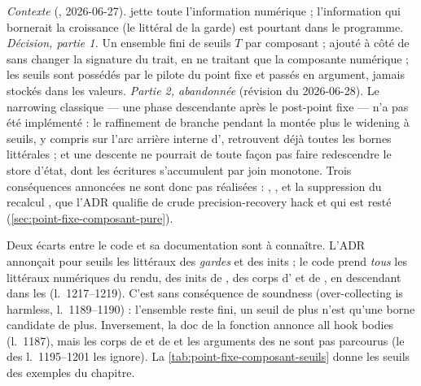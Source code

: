 \begin{decision}
\emph{Contexte} (, 2026-06-27).  jette toute
l'information numérique ; l'information qui bornerait la croissance (le
littéral  de la garde) est pourtant dans le programme.
\emph{Décision, partie 1.} Un ensemble fini de seuils $T$ par composant ;
 ajouté à côté de  sans changer la signature du
trait, en ne traitant que la composante numérique ; les seuils sont possédés
par le pilote du point fixe et passés en argument, jamais stockés dans les
valeurs. \emph{Partie 2, abandonnée} (révision du 2026-06-28). Le narrowing
classique --- une phase descendante après le post-point fixe --- n'a pas été
implémenté : le raffinement de branche pendant la montée plus le widening à
seuils, y compris sur l'arc arrière interne d', retrouvent
déjà toutes les bornes littérales ; et une descente ne pourrait de toute
façon pas faire redescendre le store d'état, dont les écritures s'accumulent
par join monotone. Trois conséquences annoncées ne sont donc pas réalisées :
, , et la suppression du
recalcul , que l'ADR qualifie de \og crude
precision-recovery hack\fg{} et qui est resté
(\cref{sec:point-fixe-composant-pure}).
\end{decision}

Deux écarts entre le code et sa documentation sont à connaître. L'ADR
annonçait pour seuils les littéraux des \emph{gardes} et des inits ; le code
prend \emph{tous} les littéraux numériques du rendu, des inits de
, des corps d' et de , en descendant
dans les  (l.~1217--1219). C'est sans conséquence de soundness
(\og over-collecting is harmless\fg, l.~1189--1190) : l'ensemble reste fini,
un seuil de plus n'est qu'une borne candidate de plus. Inversement, la doc de
la fonction annonce \og all hook bodies\fg{} (l.~1187), mais les corps de
 et de  et les arguments des  ne sont
pas parcourus (le  des l.~1195--1201 les ignore). La
\cref{tab:point-fixe-composant-seuils} donne les seuils des exemples du
chapitre.

